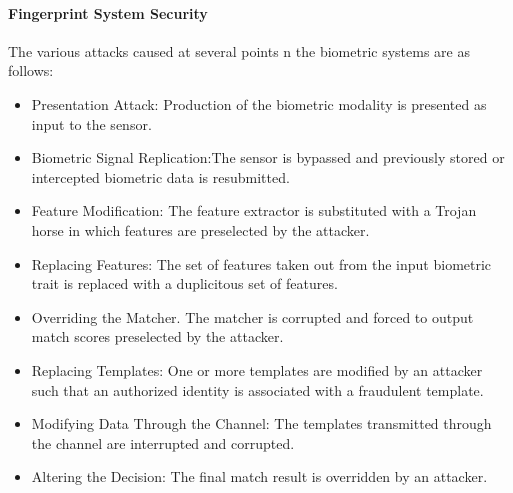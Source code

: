 \paragraph{ Fingerprint System Security}
The various attacks caused at several points n the biometric systems are as follows:
\begin{itemize}
 \item Presentation Attack: Production of the biometric modality is presented as input to the sensor.\item Biometric Signal Replication:The sensor is bypassed and previously stored or intercepted biometric data is resubmitted. \item Feature Modification: The feature extractor is substituted with a Trojan horse in which features are preselected by the attacker. \item Replacing Features: The set of features taken out from the input biometric trait is replaced with a duplicitous set of features. \item Overriding the Matcher. The matcher is corrupted and forced to output match scores preselected by the attacker. \item Replacing Templates: One or more templates are modified by an attacker such that an authorized identity is associated with a fraudulent template. \item Modifying Data Through the Channel: The templates transmitted through the channel are interrupted and corrupted. \item Altering the Decision: The final match result is overridden by an attacker. 
\end{itemize} 

